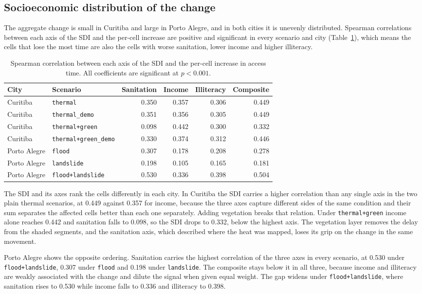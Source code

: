 \subsection{Socioeconomic distribution of the change}
\label{subsec:results-socioeconomic}

The aggregate change is small in Curitiba and large in Porto Alegre, and in both cities it is unevenly distributed. Spearman correlations between each axis of the SDI and the per-cell increase are positive and significant in every scenario and city (Table~\ref{tab:results-correlation}), which means the cells that lose the most time are also the cells with worse sanitation, lower income and higher illiteracy.

\begin{table}[htbp]
\centering
\caption{Spearman correlation between each axis of the SDI and the per-cell increase in access time. All coefficients are significant at $p < 0.001$.}
\label{tab:results-correlation}
\footnotesize
\begin{tabular}{llrrrr}
\hline
City & Scenario & Sanitation & Income & Illiteracy & Composite \\
\hline
Curitiba & \texttt{thermal} & 0.350 & 0.357 & 0.306 & 0.449 \\
Curitiba & \texttt{thermal\_demo} & 0.351 & 0.356 & 0.305 & 0.449 \\
Curitiba & \texttt{thermal+green} & 0.098 & 0.442 & 0.300 & 0.332 \\
Curitiba & \texttt{thermal+green\_demo} & 0.330 & 0.374 & 0.312 & 0.446 \\
Porto Alegre & \texttt{flood} & 0.307 & 0.178 & 0.208 & 0.278 \\
Porto Alegre & \texttt{landslide} & 0.198 & 0.105 & 0.165 & 0.181 \\
Porto Alegre & \texttt{flood+landslide} & 0.530 & 0.336 & 0.398 & 0.504 \\
\hline
\end{tabular}
\end{table}

The SDI and its axes rank the cells differently in each city. In Curitiba the SDI carries a higher correlation than any single axis in the two plain thermal scenarios, at 0.449 against 0.357 for income, because the three axes capture different sides of the same condition and their sum separates the affected cells better than each one separately. Adding vegetation breaks that relation. Under \texttt{thermal+green} income alone reaches 0.442 and sanitation falls to 0.098, so the SDI drops to 0.332, below the highest axis. The vegetation layer removes the delay from the shaded segments, and the sanitation axis, which described where the heat was mapped, loses its grip on the change in the same movement.

Porto Alegre shows the opposite ordering. Sanitation carries the highest correlation of the three axes in every scenario, at 0.530 under \texttt{flood+landslide}, 0.307 under \texttt{flood} and 0.198 under \texttt{landslide}. The composite stays below it in all three, because income and illiteracy are weakly associated with the change and dilute the signal when given equal weight. The gap widens under \texttt{flood+landslide}, where sanitation rises to 0.530 while income falls to 0.336 and illiteracy to 0.398.
